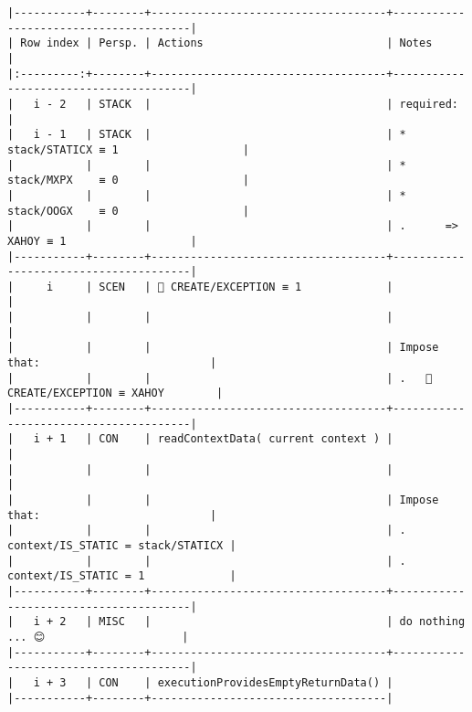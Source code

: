 \documentclass[varwidth=\maxdimen,margin=0.5cm,multi={verbatim}]{standalone}
\begin{document}
\begin{verbatim}
|-----------+--------+------------------------------------+---------------------------------------|
| Row index | Persp. | Actions                            | Notes                                 |
|:---------:+--------+------------------------------------+---------------------------------------|
|   i - 2   | STACK  |                                    | required:                             |
|   i - 1   | STACK  |                                    | * stack/STATICX ≡ 1                   |
|           |        |                                    | * stack/MXPX    ≡ 0                   |
|           |        |                                    | * stack/OOGX    ≡ 0                   |
|           |        |                                    | .      => XAHOY ≡ 1                   |
|-----------+--------+------------------------------------+---------------------------------------|
|     i     | SCEN   |  CREATE/EXCEPTION ≡ 1             |                                       |
|           |        |                                    |                                       |
|           |        |                                    | Impose that:                          |
|           |        |                                    | .    CREATE/EXCEPTION ≡ XAHOY        |
|-----------+--------+------------------------------------+---------------------------------------|
|   i + 1   | CON    | readContextData( current context ) |                                       |
|           |        |                                    |                                       |
|           |        |                                    | Impose that:                          |
|           |        |                                    | .   context/IS_STATIC = stack/STATICX |
|           |        |                                    | .   context/IS_STATIC = 1             |
|-----------+--------+------------------------------------+---------------------------------------|
|   i + 2   | MISC   |                                    | do nothing ... 😊                     |
|-----------+--------+------------------------------------+---------------------------------------|
|   i + 3   | CON    | executionProvidesEmptyReturnData() |
|-----------+--------+------------------------------------|

\end{verbatim}
\end{document}
